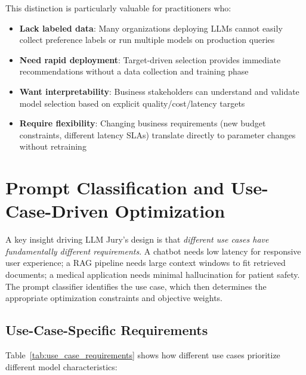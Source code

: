 \documentclass[11pt,a4paper]{article}
\begin{document}
This distinction is particularly valuable for practitioners who:
\begin{itemize}
    \item \textbf{Lack labeled data}: Many organizations deploying LLMs cannot easily collect preference labels or run multiple models on production queries
    \item \textbf{Need rapid deployment}: Target-driven selection provides immediate recommendations without a data collection and training phase
    \item \textbf{Want interpretability}: Business stakeholders can understand and validate model selection based on explicit quality/cost/latency targets
    \item \textbf{Require flexibility}: Changing business requirements (new budget constraints, different latency SLAs) translate directly to parameter changes without retraining
\end{itemize}


\section{Prompt Classification and Use-Case-Driven Optimization}

A key insight driving LLM Jury's design is that \textit{different use cases have fundamentally different requirements}. A chatbot needs low latency for responsive user experience; a RAG pipeline needs large context windows to fit retrieved documents; a medical application needs minimal hallucination for patient safety. The prompt classifier identifies the use case, which then determines the appropriate optimization constraints and objective weights.

\subsection{Use-Case-Specific Requirements}

Table~\ref{tab:use_case_requirements} shows how different use cases prioritize different model characteristics:
\end{document}

